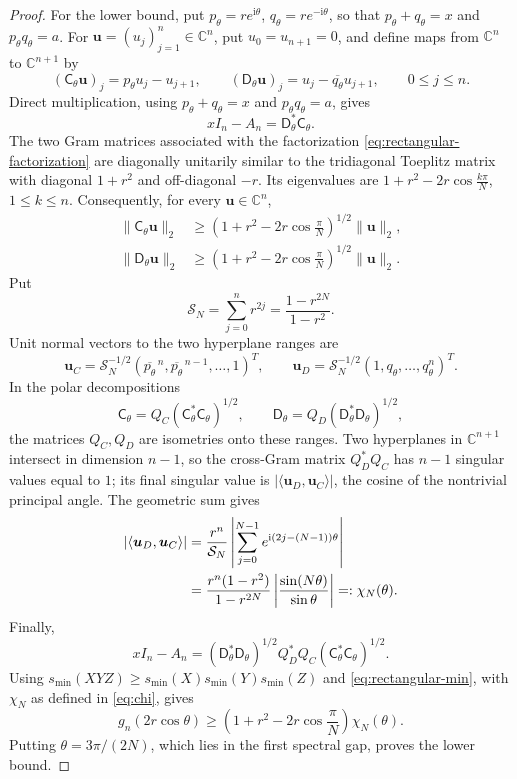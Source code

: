 \documentclass[11pt,a4paper]{article}
\numberwithin{equation}{section}
\newcommand{\C}{\mathbb C}
\newcommand{\ii}{\mathrm i}
\begin{document}
\begin{proof}
For the lower bound, put
\(p_\theta=re^{\ii\theta}\), \(q_\theta=re^{-\ii\theta}\), so that
\(p_\theta+q_\theta=x\) and \(p_\theta q_\theta=a\).  For
\(\boldsymbol u=(u_j)_{j=1}^n\in\C^n\), put \(u_0=u_{n+1}=0\), and
define maps from \(\C^n\) to \(\C^{n+1}\) by
\[
 (\mathsf{C}_\theta\boldsymbol u)_j=p_\theta u_j-u_{j+1},\qquad
 (\mathsf{D}_\theta\boldsymbol u)_j=u_j-\overline{q_\theta}u_{j+1},
 \qquad0\leq j\leq n.
\]
Direct multiplication, using \(p_\theta+q_\theta=x\) and
\(p_\theta q_\theta=a\), gives
\begin{equation}\label{eq:rectangular-factorization}
 xI_n-A_n=\mathsf{D}_\theta^*\mathsf{C}_\theta.
\end{equation}
The two Gram matrices associated with the factorization
\eqref{eq:rectangular-factorization} are
diagonally unitarily similar to the tridiagonal Toeplitz matrix with
diagonal \(1+r^2\) and off-diagonal \(-r\).  Its eigenvalues are
\(1+r^2-2r\cos\frac{k\pi}{N}\), \(1\leq k\leq n\).  Consequently, for
every \(\boldsymbol u\in\C^n\),
\begin{equation}\label{eq:rectangular-min}
 \begin{aligned}
  \lVert\mathsf C_\theta\boldsymbol u\rVert_2
  &\geq \left(1+r^2-2r\cos\frac{\pi}{N}\right)^{1/2}
    \lVert\boldsymbol u\rVert_2,\\
  \lVert\mathsf D_\theta\boldsymbol u\rVert_2
  &\geq \left(1+r^2-2r\cos\frac{\pi}{N}\right)^{1/2}
    \lVert\boldsymbol u\rVert_2.
 \end{aligned}
\end{equation}
Put
\[
 \mathcal S_N=\sum_{j=0}^nr^{2j}=\frac{1-r^{2N}}{1-r^2}.
\]
Unit normal vectors to the two hyperplane ranges are
\[
 \boldsymbol u_C=\mathcal S_N^{-1/2}
 (\overline{p_\theta}^{\,n},\overline{p_\theta}^{\,n-1},\ldots,1)^T,
 \qquad
 \boldsymbol u_D=\mathcal S_N^{-1/2}(1,q_\theta,\ldots,q_\theta^n)^T.
\]
In the polar decompositions
\[
 \mathsf{C}_\theta=Q_C(\mathsf{C}_\theta^*\mathsf{C}_\theta)^{1/2},
 \qquad
 \mathsf{D}_\theta=Q_D(\mathsf{D}_\theta^*\mathsf{D}_\theta)^{1/2},
\]
the matrices \(Q_C,Q_D\) are isometries onto these ranges.  Two
hyperplanes in \(\C^{n+1}\) intersect in dimension \(n-1\), so
the cross-Gram matrix \(Q_D^*Q_C\) has \(n-1\) singular values equal to
\(1\); its final singular value is
\(|\langle\boldsymbol u_D,\boldsymbol u_C\rangle|\), the cosine of the
nontrivial principal angle.  The
geometric sum gives
\begin{align}
 |\langle\boldsymbol u_D,\boldsymbol u_C\rangle|
 &=\frac{r^n}{\mathcal S_N}
 \left|\sum_{j=0}^{N-1}e^{\ii(2j-(N-1))\theta}\right|\notag\\
 &=
 \frac{r^n(1-r^2)}{1-r^{2N}}
 \left|\frac{\sin(N\theta)}{\sin\theta}\right|
 =:\chi_N(\theta).
\label{eq:chi}
\end{align}
Finally,
\[
 xI_n-A_n=(\mathsf{D}_\theta^*\mathsf{D}_\theta)^{1/2}
 Q_D^*Q_C(\mathsf{C}_\theta^*\mathsf{C}_\theta)^{1/2}.
\]
Using \(s_{\min}(XYZ)\geq
s_{\min}(X)s_{\min}(Y)s_{\min}(Z)\) and
\eqref{eq:rectangular-min}, with \(\chi_N\) as defined in
\eqref{eq:chi}, gives
\[
 g_n(2r\cos\theta)\geq
 \left(1+r^2-2r\cos\frac{\pi}{N}\right)\chi_N(\theta).
\]
Putting \(\theta=3\pi/(2N)\), which lies in the first spectral gap,
proves the lower bound.


\end{proof}
\end{document}
